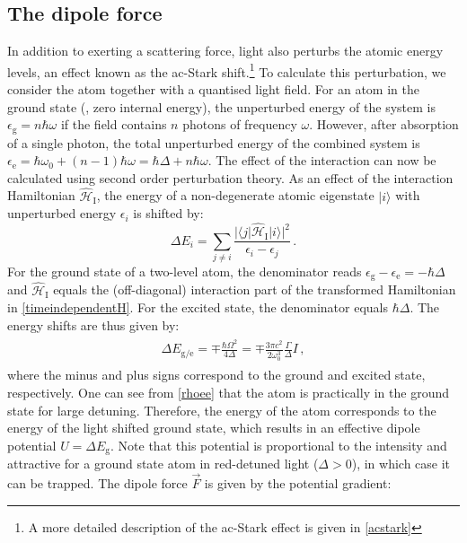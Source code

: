 \documentclass[../Thesis-IJspeert.tex]{subfiles}
\begin{document}
\subsection{The dipole force}
\label{dipoleforce}
In addition to exerting a scattering force, light also perturbs the atomic energy levels, an effect known as the ac-Stark shift.\footnote{A more detailed description of the ac-Stark effect is given in \autoref{acstark}} To calculate this perturbation, we consider the atom together with a quantised light field. For an atom in the ground state (\ie, zero internal energy), the unperturbed energy of the system is $\epsilon_\mathrm{g}=n\hbar \omega$ if the field contains $n$ photons of frequency $\omega$. However, after absorption of a single photon, the total unperturbed energy of the combined system is $\epsilon_\mathrm{e}=\hbar \omega_0+(n-1)\hbar\omega=\hbar\Delta+n\hbar\omega$. The effect of the interaction can now be calculated using second order perturbation theory. As an effect of the interaction Hamiltonian $\hat{\mathcal{H}}_\mathrm{I}$, the energy of a non-degenerate atomic eigenstate $\vert i \rangle$ with unperturbed energy $\epsilon_i$ is shifted by:
\begin{equation}
\Delta E_i=\sum_{j\neq i}\frac{\lvert \langle j \vert\hat{\mathcal{H}}_\mathrm{I} \vert i \rangle\rvert^2}{\epsilon_i-\epsilon_j}\,.
\end{equation}
For the ground state of a two-level atom, the denominator reads $\epsilon_\mathrm{g} - \epsilon_\mathrm{e} = -\hbar \Delta$ and $\hat{\mathcal{H}}_\mathrm{I}$ equals the (off-diagonal) interaction part of the transformed Hamiltonian in \autoref{timeindependentH}. For the excited state, the denominator equals $\hbar\Delta$. The energy shifts are thus given by:
\begin{align}
\begin{split}
\Delta E_\mathrm{g/e}=\mp\frac{\hbar\Omega^2}{4\Delta}=\mp \frac{3\pi c^2}{2\omega_0^3}\frac{\Gamma}{\Delta}I\,,
\end{split}
\end{align}
where the minus and plus signs correspond to the ground and excited state, respectively. One can see from \autoref{rhoee} that the atom is practically in the ground state for large detuning. Therefore, the energy of the atom corresponds to the energy of the light shifted ground state, which results in an effective dipole potential $U = \Delta E_\mathrm{g}$. Note that this potential is proportional to the intensity and attractive for a ground state atom in red-detuned light ($\Delta>0$), in which case it can be trapped. The dipole force $\vec{F}$ is given by the potential gradient:
\end{document}

